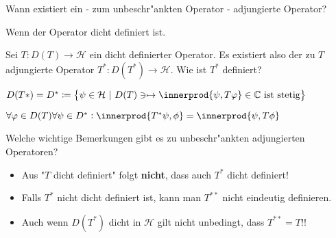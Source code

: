 \documentclass[9pt]{article}
\newcommand{\C}[1]{%
	\ifthenelse{\equal{#1}{}}
	{\mathbb{C}}
	{\mathbb{C}^{#1}}}%
\DeclarePairedDelimiter{\innerprod}\langle\rangle
\newcommand{\Hi}{\mathcal{H}}
\newenvironment{field}{}{\newpage}
\newif\ifnote
\newenvironment{note}{\notetrue}{\notefalse}
\newcommand{\localtag}{}
\newcommand{\globaltag}{}
\newcommand{\uuid}{}
\newcommand{\tags}[1]{
    \ifnote 
        \renewcommand{\localtag}{#1}
    \else
        \renewcommand{\globaltag}{#1}
    \fi 
    }
\newcommand{\xplain}[1]{\renewcommand{\uuid}{#1}}
\begin{document}
	\begin{note}
		\xplain{a16a3dd4-e1ab-4e92-a6bd-a22a39844a31}
		\tags{6.2.7}
		
		\begin{field}  %
			Wann existiert ein - zum unbeschr"ankten Operator - adjungierte Operator?
		\end{field}
		
		\begin{field}  %
			Wenn der Operator dicht definiert ist.
		\end{field}
			
		\begin{field}  %
			Sei $T:D(T)\rightarrow \Hi$ ein dicht definierter Operator. Es existiert also der zu $T$ adjungierte Operator 
			$T^*:D(T^*) \rightarrow \Hi$. Wie ist $T^*$ definiert? 
		\end{field}
		
		\begin{field}  %
			$D(T*) = D^*\coloneqq \qty{\psi \in \Hi \ | \ D(T) \ni \mapsto \innerprod{\psi, T\varphi} \in \C{} \text{ ist stetig}}$
			
			$\forall \varphi \in D(T) \forall \psi \in D^*: \innerprod{T^*\psi, \phi} = \innerprod{\psi, T\phi}$			
		\end{field}
		
	\begin{field}  %
		Welche wichtige Bemerkungen gibt es zu   unbeschr"ankten adjungierten Operatoren?
	\end{field}
	
	\begin{field}  %
		\begin{itemize}
			\item Aus "$T$ dicht definiert"  folgt \textbf{nicht}, dass auch $T^*$ dicht definiert!
			\item Falls $T^*$ nicht dicht definiert ist, kann man $T^{**}$ 	nicht eindeutig definieren.
			\item Auch wenn $D(T^*)$ dicht in $\Hi$ gilt nicht unbedingt, dass $T^{**} = T$!!
		\end{itemize}
	\end{field}
	\end{note}
\end{document}
